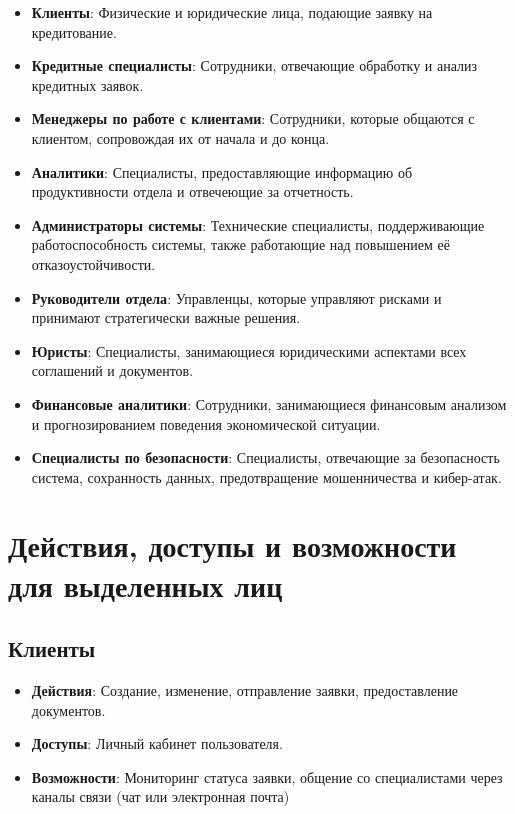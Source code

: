 \documentclass[20pt]{article}
\begin{document}
\begin{itemize}
    \item \textbf{Клиенты}: Физические и юридические лица, подающие заявку на кредитование.
    \item \textbf{Кредитные специалисты}: Сотрудники, отвечающие обработку и анализ кредитных заявок.
    \item \textbf{Менеджеры по работе с клиентами}: Сотрудники, которые общаются с клиентом, сопровождая их от начала и до конца.
    \item \textbf{Аналитики}: Специалисты, предоставляющие информацию об продуктивности отдела и отвечеющие за отчетность.
    \item \textbf{Администраторы системы}: Технические специалисты, поддерживающие работоспособность системы, также работающие над повышением её отказоустойчивости.
    \item \textbf{Руководители отдела}: Управленцы, которые управляют рисками и принимают стратегически важные решения.
    \item \textbf{Юристы}: Специалисты, занимающиеся юридическими аспектами всех соглашений и документов. 
    \item \textbf{Финансовые аналитики}: Сотрудники, занимающиеся финансовым анализом и прогнозированием поведения экономической ситуации.
    \item \textbf{Специалисты по безопасности}: Специалисты, отвечающие за безопасность система, сохранность данных, предотвращение мошенничества и кибер-атак.
\end{itemize}

\section{Действия, доступы и возможности для выделенных лиц}

\subsection{Клиенты}
\begin{itemize}
    \item \textbf{Действия}: Создание, изменение, отправление заявки, предоставление документов.
    \item \textbf{Доступы}: Личный кабинет пользователя.
    \item \textbf{Возможности}: Мониторинг статуса заявки, общение со специалистами через каналы связи (чат или электронная почта)
\end{itemize}
\end{document}
